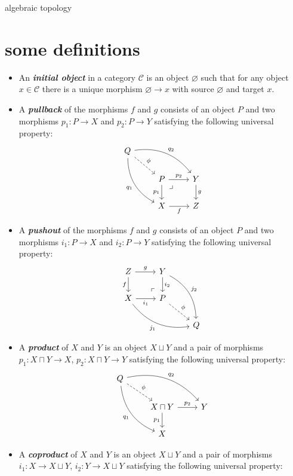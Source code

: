\documentclass{article}
\numberwithin{equation}{section}
\newcommand{\Cc}{\mathcal{C}}
\begin{document}
{\LARGE algebraic topology}
\tableofcontents
\section{some definitions}
\begin{defn}\leavevmode
	\begin{itemize}
		\item An \textbf{\textit{initial object}} in a category $\Cc$ is an object $\varnothing$ such that for any object $x\in\Cc$ there is a unique morphism $\varnothing\to x$ with source $\varnothing$ and target $x$.
		
		\item A \textbf{\textit{pullback}} of the morphisms $f$ and $g$ consists of an object $P$ and two morphisms $p_1:P\to X$ and $p_2:P\to Y$ satisfying the following universal property:
	\[\begin{tikzcd}
		Q\arrow[rrd,bend left,"q_2"]\arrow[ddr,"q_1",swap,bend right]\arrow[dr,dashed,"\phi"]\\
		&P\arrow[r,"p_2"] \arrow[rd, phantom, "\lrcorner", very near start]\arrow[d,"p_1",swap]&Y\arrow[d,"g"]\\
		&X\arrow[r,"f",swap]&Z
	\end{tikzcd}\]
	\item A \textbf{\textit{pushout}} of the morphisms $f$ and $g$ consists of an object $P$ and two morphisms $i_1:P\to X$ and $i_2:P\to Y$ satisfying the following universal property:
	\[\begin{tikzcd}
		Z\arrow[r,"g"]\arrow[d,swap,"f"]&Y\arrow[d,"i_2"]\arrow[ddr,bend left,"j_2"]\\
		X\arrow[r,"i_1",swap]\arrow[drr,bend right,swap,"j_1"]&P\arrow[ul, phantom, "\ulcorner", very near start]\arrow[dr,dashed,"\phi"]\\
		&&Q
	\end{tikzcd}\]
	\item A \textbf{\textit{product}} of $X$ and $Y$ is an object $X\sqcup Y$ and a pair of morphisms $p_1:X\sqcap Y\to X$, $p_2:X\sqcap Y\to Y$ satisfying the following universal property:
	\[\begin{tikzcd}
		Q\arrow[rrd,bend left,"q_2"]\arrow[ddr,"q_1",swap,bend right]\arrow[dr,dashed,"\phi"]\\
		&X\sqcap Y\arrow[r,"p_2"]\arrow[d,"p_1",swap]&Y\\
		&X
	\end{tikzcd}\]
	\item A \textbf{\textit{coproduct}} of $X$ and $Y$ is an object $X\sqcup Y$ and a pair of morphisms $i_1:X\to X\sqcup Y$, $i_2:Y\to X\sqcup Y$ satisfying the following universal property:

\end{itemize}
\end{defn}
\end{document}
